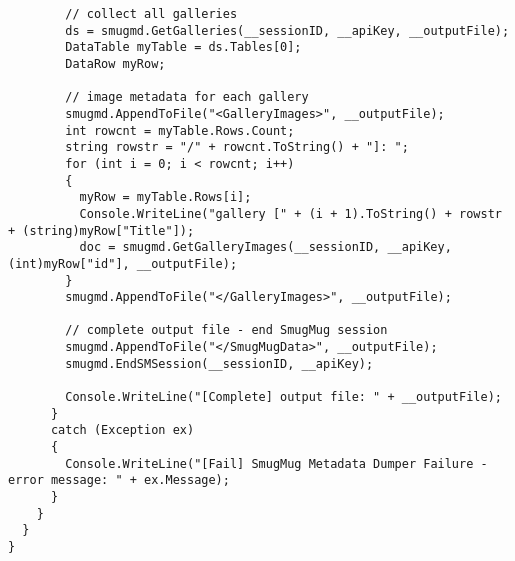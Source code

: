 \begin{tcolorbox}[breakable, size=fbox, boxrule=1pt, pad at break*=1mm,colback=cellbackground, colframe=cellborder]
\begin{lstlisting}
        // collect all galleries
        ds = smugmd.GetGalleries(__sessionID, __apiKey, __outputFile);
        DataTable myTable = ds.Tables[0];
        DataRow myRow;

        // image metadata for each gallery
        smugmd.AppendToFile("<GalleryImages>", __outputFile);
        int rowcnt = myTable.Rows.Count;
        string rowstr = "/" + rowcnt.ToString() + "]: ";
        for (int i = 0; i < rowcnt; i++)
        {
          myRow = myTable.Rows[i];
          Console.WriteLine("gallery [" + (i + 1).ToString() + rowstr + (string)myRow["Title"]);
          doc = smugmd.GetGalleryImages(__sessionID, __apiKey, (int)myRow["id"], __outputFile);
        }
        smugmd.AppendToFile("</GalleryImages>", __outputFile);

        // complete output file - end SmugMug session
        smugmd.AppendToFile("</SmugMugData>", __outputFile);
        smugmd.EndSMSession(__sessionID, __apiKey);

        Console.WriteLine("[Complete] output file: " + __outputFile);
      }
      catch (Exception ex)
      {
        Console.WriteLine("[Fail] SmugMug Metadata Dumper Failure - error message: " + ex.Message);
      }
    }
  }
}
\end{lstlisting}
\end{tcolorbox}
\lstset{style=resetdefaults}

%